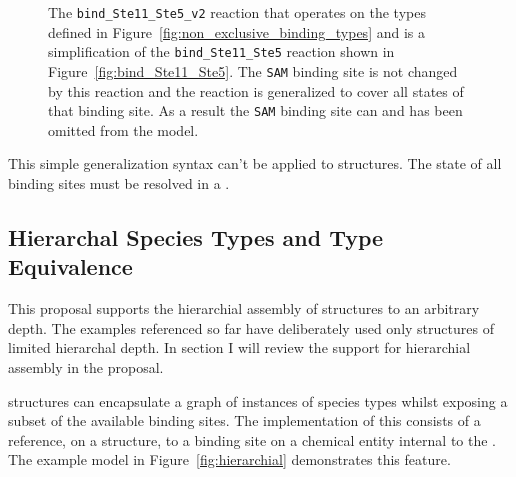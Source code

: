 \documentclass{cekarticle}
\begin{document}
\begin{figure}[h]
  \caption{
  The \texttt{bind\_Ste11\_Ste5\_v2} reaction that operates on the types defined in
  Figure~\ref{fig:non_exclusive_binding_types} and is a simplification of the \texttt{bind\_Ste11\_Ste5}
  reaction shown in Figure~\ref{fig:bind_Ste11_Ste5}. The \texttt{SAM} binding site is not changed by
  this reaction and the reaction is generalized to cover all states of that binding site.  As a result
  the
  \texttt{SAM}
  binding site
  can and
  has been omitted from the model.}
  
  \label{fig:bind_Ste11_Ste5_v2}
\end{figure}

This simple generalization syntax can't be applied to  structures. 
The state of all binding sites must be resolved in a .

\subsection{Hierarchal Species Types and Type Equivalence}

This proposal supports the hierarchial assembly of  structures to an arbitrary depth.
The examples referenced so far have deliberately used only structures of limited hierarchal depth.  In
section I will review the support for hierarchial assembly in the proposal. 

 structures can encapsulate a graph of instances of species types whilst exposing
a subset of the available binding sites.  The implementation of this consists of a reference,
on a  structure, to a binding site on a chemical entity internal to the
.  The example model in Figure~\ref{fig:hierarchial} demonstrates this feature.
\end{document}
